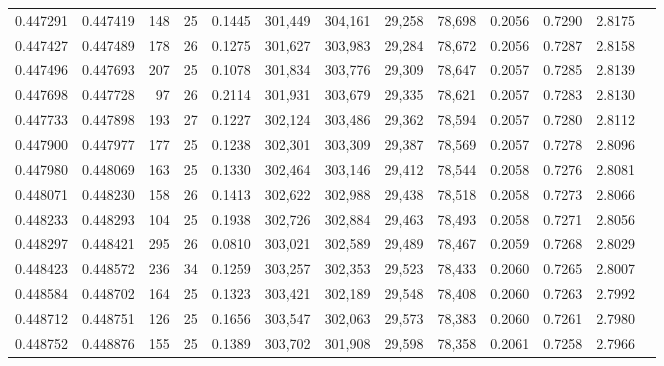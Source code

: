 \begin{tabular}{rrrrrrrrrrrrr}
0.447291 & 0.447419 &   148 &  25 &                                     0.1445 & 301,449 & 304,161 &  29,258 &  78,698 & 0.2056 & 0.7290 & 2.8175 \\
0.447427 & 0.447489 &   178 &  26 &                                     0.1275 & 301,627 & 303,983 &  29,284 &  78,672 & 0.2056 & 0.7287 & 2.8158 \\
0.447496 & 0.447693 &   207 &  25 &                                     0.1078 & 301,834 & 303,776 &  29,309 &  78,647 & 0.2057 & 0.7285 & 2.8139 \\
0.447698 & 0.447728 &    97 &  26 &                                     0.2114 & 301,931 & 303,679 &  29,335 &  78,621 & 0.2057 & 0.7283 & 2.8130 \\
0.447733 & 0.447898 &   193 &  27 &                                     0.1227 & 302,124 & 303,486 &  29,362 &  78,594 & 0.2057 & 0.7280 & 2.8112 \\
0.447900 & 0.447977 &   177 &  25 &                                     0.1238 & 302,301 & 303,309 &  29,387 &  78,569 & 0.2057 & 0.7278 & 2.8096 \\
0.447980 & 0.448069 &   163 &  25 &                                     0.1330 & 302,464 & 303,146 &  29,412 &  78,544 & 0.2058 & 0.7276 & 2.8081 \\
0.448071 & 0.448230 &   158 &  26 &                                     0.1413 & 302,622 & 302,988 &  29,438 &  78,518 & 0.2058 & 0.7273 & 2.8066 \\
0.448233 & 0.448293 &   104 &  25 &                                     0.1938 & 302,726 & 302,884 &  29,463 &  78,493 & 0.2058 & 0.7271 & 2.8056 \\
0.448297 & 0.448421 &   295 &  26 &                                     0.0810 & 303,021 & 302,589 &  29,489 &  78,467 & 0.2059 & 0.7268 & 2.8029 \\
0.448423 & 0.448572 &   236 &  34 &                                     0.1259 & 303,257 & 302,353 &  29,523 &  78,433 & 0.2060 & 0.7265 & 2.8007 \\
0.448584 & 0.448702 &   164 &  25 &                                     0.1323 & 303,421 & 302,189 &  29,548 &  78,408 & 0.2060 & 0.7263 & 2.7992 \\
0.448712 & 0.448751 &   126 &  25 &                                     0.1656 & 303,547 & 302,063 &  29,573 &  78,383 & 0.2060 & 0.7261 & 2.7980 \\
0.448752 & 0.448876 &   155 &  25 &                                     0.1389 & 303,702 & 301,908 &  29,598 &  78,358 & 0.2061 & 0.7258 & 2.7966 \\

\end{tabular}
